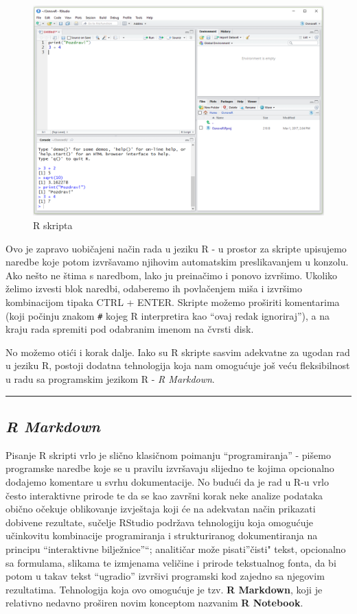 \documentclass[]{book}
\theoremstyle{definition}
\theoremstyle{definition}
\theoremstyle{definition}
\theoremstyle{remark}
\begin{document}
\begin{figure}
\centering
\includegraphics{figures/RStudio3.png}
\caption{\label{fig:unnamed-chunk-5}R skripta}
\end{figure}

Ovo je zapravo uobičajeni način rada u jeziku R - u prostor za skripte
upisujemo naredbe koje potom izvršavamo njihovim automatskim
preslikavanjem u konzolu. Ako nešto ne štima s naredbom, lako ju
preinačimo i ponovo izvršimo. Ukoliko želimo izvesti blok naredbi,
odaberemo ih povlačenjem miša i izvršimo kombinacijom tipaka CTRL +
ENTER. Skripte možemo proširiti komentarima (koji počinju znakom
\texttt{\#} kojeg R interpretira kao ``ovaj redak ignoriraj''), a na
kraju rada spremiti pod odabranim imenom na čvrsti disk.

No možemo otići i korak dalje. Iako su R skripte sasvim adekvatne za
ugodan rad u jeziku R, postoji dodatna tehnologija koja nam omogućuje
još veću fleksibilnost u radu sa programskim jezikom R - \emph{R
Markdown}.

\begin{center}\rule{0.5\linewidth}{\linethickness}\end{center}

\subsection{\texorpdfstring{\emph{R
Markdown}}{R Markdown}}\label{r-markdown}

Pisanje R skripti vrlo je slično klasičnom poimanju ``programiranja'' -
pišemo programske naredbe koje se u pravilu izvršavaju slijedno te
kojima opcionalno dodajemo komentare u svrhu dokumentacije. No budući da
je rad u R-u vrlo često interaktivne prirode te da se kao završni korak
neke analize podataka obično očekuje oblikovanje izvještaja koji će na
adekvatan način prikazati dobivene rezultate, sučelje RStudio podržava
tehnologiju koja omogućuje učinkovitu kombinacije programiranja i
strukturiranog dokumentiranja na principu ``interaktivne bilježnice''``;
analitičar može pisati''čisti" tekst, opcionalno sa formulama, slikama
te izmjenama veličine i prirode tekstualnog fonta, da bi potom u takav
tekst ``ugradio'' izvršivi programski kod zajedno sa njegovim
rezultatima. Tehnologija koja ovo omogućuje je tzv. \textbf{R Markdown},
koji je relativno nedavno proširen novim konceptom nazvanim \textbf{R
Notebook}.
\end{document}
